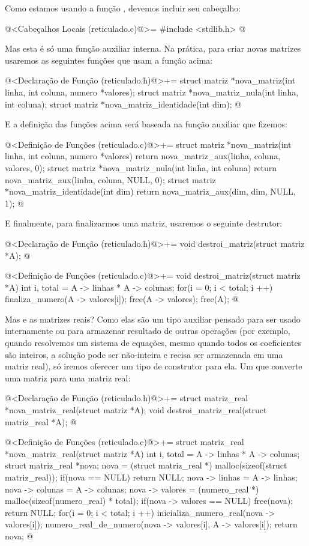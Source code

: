 Como estamos usando a função , devemos incluir seu
cabeçalho:

\iniciocodigo
@<Cabeçalhos Locais (reticulado.c)@>=
#include <stdlib.h>
@
\fimcodigo

Mas esta é só uma função auxiliar interna. Na prática, para criar
novas matrizes usaremos as seguintes funções que usam a função acima:

\iniciocodigo
@<Declaração de Função (reticulado.h)@>+=
struct matriz *nova_matriz(int linha, int coluna, numero *valores);
struct matriz *nova_matriz_nula(int linha, int coluna);
struct matriz *nova_matriz_identidade(int dim);
@
\fimcodigo

E a definição das funções acima será baseada na função auxiliar que
fizemos:

\iniciocodigo
@<Definição de Funções (reticulado.c)@>+=
struct matriz *nova_matriz(int linha, int coluna, numero *valores){
  return nova_matriz_aux(linha, coluna, valores, 0);
}
struct matriz *nova_matriz_nula(int linha, int coluna){
  return nova_matriz_aux(linha, coluna, NULL, 0);
}
struct matriz *nova_matriz_identidade(int dim){
  return nova_matriz_aux(dim, dim, NULL, 1);
}
@
\fimcodigo

E finalmente, para finalizarmos uma matriz, usaremos o seguinte
destrutor:

\iniciocodigo
@<Declaração de Função (reticulado.h)@>+=
void destroi_matriz(struct matriz *A);
@
\fimcodigo

\iniciocodigo
@<Definição de Funções (reticulado.c)@>+=
void destroi_matriz(struct matriz *A){
  int i, total = A -> linhas * A -> colunas;
  for(i = 0; i < total; i ++){
    finaliza_numero(A -> valores[i]);
  }
  free(A -> valores);
  free(A);
}
@
\fimcodigo

Mas e as matrizes reais? Como elas são um tipo auxiliar pensado para
ser usado internamente ou para armazenar resultado de outras operações
(por exemplo, quando resolvemos um sistema de equações, mesmo quando
todos os coeficientes são inteiros, a solução pode ser não-inteira e
recisa ser armazenada em uma matriz real), só iremos oferecer um tipo
de construtor para ela. Um que converte uma matriz para uma matriz
real:

\iniciocodigo
@<Declaração de Função (reticulado.h)@>+=
struct matriz_real *nova_matriz_real(struct matriz *A);
void destroi_matriz_real(struct matriz_real *A);
@
\fimcodigo

\iniciocodigo
@<Definição de Funções (reticulado.c)@>+=
struct matriz_real *nova_matriz_real(struct matriz *A){
  int i, total = A -> linhas * A -> colunas;
  struct matriz_real *nova;
  nova = (struct matriz_real *) malloc(sizeof(struct matriz_real));
  if(nova == NULL)
    return NULL;
  nova -> linhas = A -> linhas;
  nova -> colunas = A -> colunas;
  nova -> valores = (numero_real *) malloc(sizeof(numero_real) * total);
  if(nova -> valores == NULL){
    free(nova);
    return NULL;
  }
  for(i = 0; i < total; i ++){
    inicializa_numero_real(nova -> valores[i]);
    numero_real_de_numero(nova -> valores[i], A -> valores[i]);
  }
  return nova;
}
@
\fimcodigo

